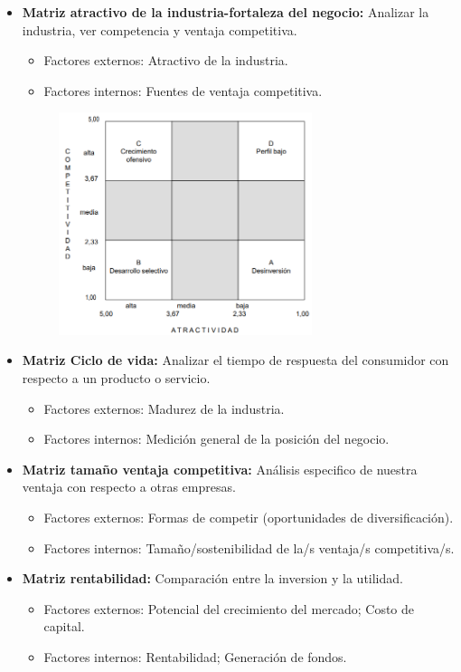 \documentclass{templateNote}
\begin{document}
\begin{itemize}
\begin{itemize}
        \newpage
        \item \textbf{Matriz atractivo de la industria-fortaleza del negocio:} Analizar la industria, ver competencia y ventaja competitiva.
        \begin{itemize}
            \item Factores externos: Atractivo de la industria.
            \item Factores internos: Fuentes de ventaja competitiva.
        \end{itemize}
        \begin{figure}[H]
            \centering
            \includegraphics[width=0.7\textwidth]{img/matriz_atractivo.png}
        \end{figure}
        \item \textbf{Matriz Ciclo de vida:} Analizar el tiempo de respuesta del consumidor con respecto a un producto o servicio.
        \begin{itemize}
            \item Factores externos: Madurez de la industria.
            \item Factores internos: Medición general de la posición del negocio.
        \end{itemize}
        \item \textbf{Matriz tamaño ventaja competitiva:} Análisis especifico de nuestra ventaja con respecto a otras empresas.
        \begin{itemize}
            \item Factores externos: Formas de competir (oportunidades de diversificación).
            \item Factores internos: Tamaño/sostenibilidad de la/s ventaja/s competitiva/s.
        \end{itemize}
        \item \textbf{Matriz rentabilidad:} Comparación entre la inversion y la utilidad. 
        \begin{itemize}
            \item Factores externos: Potencial del crecimiento del mercado; Costo de capital.
            \item Factores internos: Rentabilidad; Generación de fondos.
        \end{itemize}
    \end{itemize}
\end{itemize}
\end{document}
